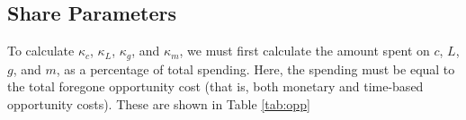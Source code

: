 \documentclass[letter, 12pt, epsf,leqno]{article}
\begin{document}
%
%
%
%
%
%
%
%
%
%

\subsection{Share Parameters}
To calculate $\kappa_c$, $\kappa_L$, $\kappa_g$, and $\kappa_m$, we must first calculate the amount spent on $c$, $L$, $g$, and $m$, as a percentage of total spending.  Here, the spending must be equal to the total foregone opportunity cost (that is, both monetary and time-based opportunity costs).  These are shown in Table \ref{tab:opp}
\end{document}
